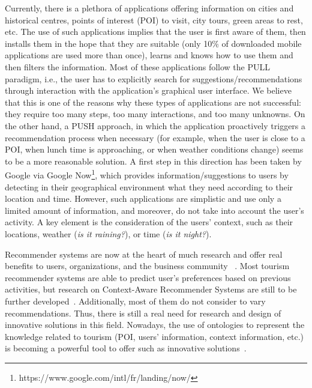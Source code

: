 Currently, there is a plethora of applications offering information on cities and historical centres, points of interest (POI) to visit, city tours, green areas to rest, etc. The use of such applications implies that the user is first aware of them, then installs them in the hope that they are suitable (only 10\% of downloaded mobile applications are used more than once), learns and knows how
to use them and then filters the 
information.
Most of these
applications follow the PULL paradigm, i.e., the user has to explicitly search for
suggestions/recommendations through interaction with the application’s graphical user interface.
We believe that this is one of the reasons why these types of applications are not successful: they
require too many steps, too many interactions, and too many unknowns. On the other hand, a
PUSH approach, in which the application proactively triggers a recommendation process when
necessary (for example, when the user is close to a POI, when lunch time is approaching, or
when weather conditions change) seems to be a more reasonable solution. A first step in this
direction has been taken by Google via Google Now\footnote{https://www.google.com/intl/fr/landing/now/}, 
which provides information/suggestions
to users by detecting in their geographical environment what they need according to their
location and time. However, such applications are simplistic and use only a limited amount of
information, and moreover, do not take into account the user’s activity. A key element is the
consideration of the users' context, such as their locations, weather (\textit{is it raining?}), or time (\textit{is it night?}).

Recommender systems are now at the heart of
much research and offer real benefits to users, organizations, and the business community
~\cite{borras2014intelligent,del2016pull,lim2019tour,leskovec2020mining}.
Most tourism recommender systems are able to predict user's preferences based on previous activities, but research on Context-Aware Recommender Systems
are still to be further developed~\cite{adomavicius2011context,haruna2017context,raza2019progress}. 
Additionally, most of them
do not consider to vary recommendations. %
Thus, there is still a real need for research and design of innovative solutions in this field. Nowadays, the use of ontologies to represent the knowledge related to tourism (POI, users' information, context information, etc.) is becoming a powerful tool to offer such as innovative solutions~\cite{borras2014intelligent,yochum2020linked}.


